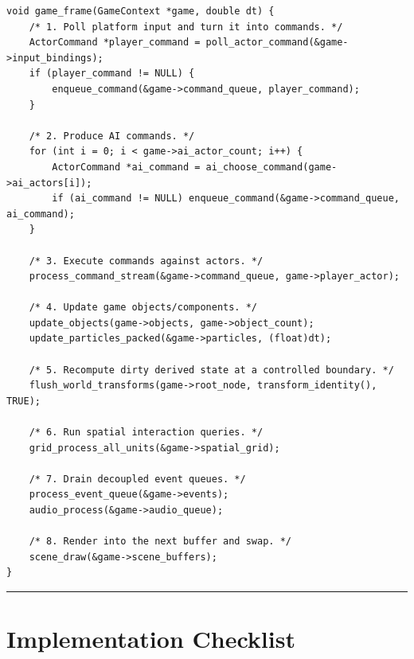 \documentclass[10pt,letterpaper]{article}
\begin{document}
\begin{verbatim}
void game_frame(GameContext *game, double dt) {
    /* 1. Poll platform input and turn it into commands. */
    ActorCommand *player_command = poll_actor_command(&game->input_bindings);
    if (player_command != NULL) {
        enqueue_command(&game->command_queue, player_command);
    }

    /* 2. Produce AI commands. */
    for (int i = 0; i < game->ai_actor_count; i++) {
        ActorCommand *ai_command = ai_choose_command(game->ai_actors[i]);
        if (ai_command != NULL) enqueue_command(&game->command_queue, ai_command);
    }

    /* 3. Execute commands against actors. */
    process_command_stream(&game->command_queue, game->player_actor);

    /* 4. Update game objects/components. */
    update_objects(game->objects, game->object_count);
    update_particles_packed(&game->particles, (float)dt);

    /* 5. Recompute dirty derived state at a controlled boundary. */
    flush_world_transforms(game->root_node, transform_identity(), TRUE);

    /* 6. Run spatial interaction queries. */
    grid_process_all_units(&game->spatial_grid);

    /* 7. Drain decoupled event queues. */
    process_event_queue(&game->events);
    audio_process(&game->audio_queue);

    /* 8. Render into the next buffer and swap. */
    scene_draw(&game->scene_buffers);
}
\end{verbatim}

\medskip\hrule\medskip

\section{Implementation Checklist}
\end{document}
